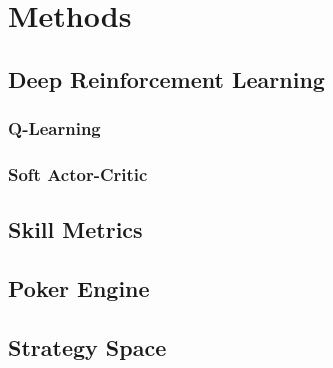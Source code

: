 \chapter{Methods}

\section{Deep Reinforcement Learning}
\subsection{Q-Learning}
\subsection{Soft Actor-Critic}
\section{Skill Metrics}
\section{Poker Engine}
\section{Strategy Space}